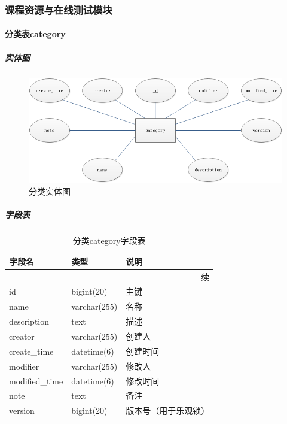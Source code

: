 \documentclass[titlepage,UTF8,linespread=1.5]{ctexart}
\begin{document}
\subsubsection{课程资源与在线测试模块}
\paragraph{分类表category}
\subparagraph{实体图}
\begin{figure}[H]
    \centering
    \includegraphics[width=140mm]{entity-category.png}
    \caption{分类实体图}
    \label{fig:entity-category}
\end{figure}
\subparagraph{字段表}
\begin{longtable}{|p{10em}|p{6em}|p{15em}|}
    \caption{分类category字段表}\label{tab:table_category} \\\hline
    字段名         & 类型         & 说明                   \\\hline
    \endfirsthead
    \multicolumn{3}{r}{{续\tablename\thetable{}}}          \\\hline
    \endhead
    id             & bigint(20)   & 主键                   \\\hline
    name           & varchar(255) & 名称                   \\\hline
    description    & text         & 描述                   \\\hline
    creator        & varchar(255) & 创建人                 \\\hline
    create\_time   & datetime(6)  & 创建时间               \\\hline
    modifier       & varchar(255) & 修改人                 \\\hline
    modified\_time & datetime(6)  & 修改时间               \\\hline
    note           & text         & 备注                   \\\hline
    version        & bigint(20)   & 版本号（用于乐观锁）   \\\hline
\end{longtable}\par
\end{document}
